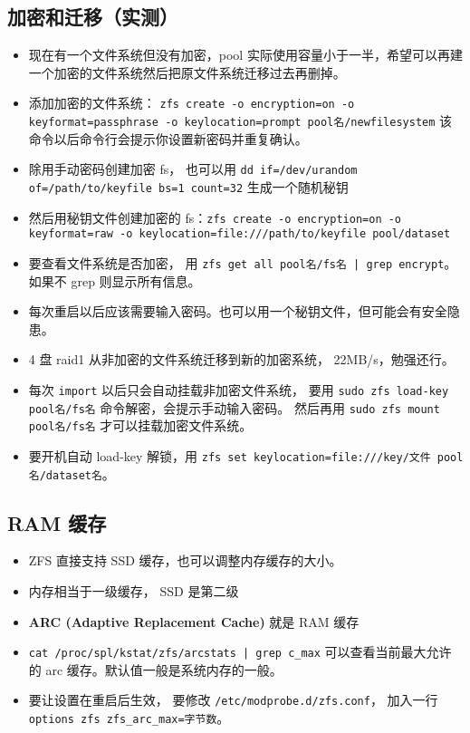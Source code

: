 \subsection{加密和迁移（实测）}
\begin{itemize}
\item 现在有一个文件系统但没有加密，pool 实际使用容量小于一半，希望可以再建一个加密的文件系统然后把原文件系统迁移过去再删掉。
\item 添加加密的文件系统： \verb`zfs create -o encryption=on -o keyformat=passphrase -o keylocation=prompt pool名/newfilesystem` 该命令以后命令行会提示你设置新密码并重复确认。
\item 除用手动密码创建加密 fs， 也可以用 \verb`dd if=/dev/urandom of=/path/to/keyfile bs=1 count=32` 生成一个随机秘钥
\item 然后用秘钥文件创建加密的 fs：\verb`zfs create -o encryption=on -o keyformat=raw -o keylocation=file:///path/to/keyfile pool/dataset`
\item 要查看文件系统是否加密， 用 \verb`zfs get all pool名/fs名 | grep encrypt`。 如果不 grep 则显示所有信息。
\item 每次重启以后应该需要输入密码。也可以用一个秘钥文件，但可能会有安全隐患。
\item 4 盘 raid1 从非加密的文件系统迁移到新的加密系统， 22MB/s，勉强还行。
\item 每次 \verb`import` 以后只会自动挂载非加密文件系统， 要用 \verb`sudo zfs load-key pool名/fs名` 命令解密，会提示手动输入密码。 然后再用 \verb`sudo zfs mount pool名/fs名` 才可以挂载加密文件系统。
\item 要开机自动 load-key 解锁，用 \verb`zfs set keylocation=file:///key/文件 pool名/dataset名`。
\end{itemize}

\subsection{RAM 缓存}
\begin{itemize}
\item ZFS 直接支持 SSD 缓存，也可以调整内存缓存的大小。
\item 内存相当于一级缓存， SSD 是第二级
\item \textbf{ARC (Adaptive Replacement Cache) }就是 RAM 缓存
\item \verb`cat /proc/spl/kstat/zfs/arcstats | grep c_max` 可以查看当前最大允许的 arc 缓存。默认值一般是系统内存的一般。
\item 要让设置在重启后生效， 要修改 \verb`/etc/modprobe.d/zfs.conf`， 加入一行 \verb`options zfs zfs_arc_max=字节数`。 
\end{itemize}

